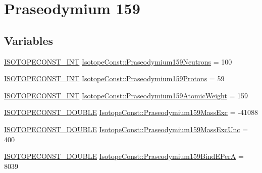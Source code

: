 \hypertarget{group___isotope_const-_praseodymium-_pr159}{}\section{Praseodymium 159}
\label{group___isotope_const-_praseodymium-_pr159}
\subsection*{Variables}
\begin{DoxyCompactItemize}
\item 
\mbox{\hyperlink{group___isotope_const-_macros_ga5f18360b3e99483a35c32d789e62621c}{I\+S\+O\+T\+O\+P\+E\+C\+O\+N\+S\+T\+\_\+\+I\+NT}} \mbox{\hyperlink{group___isotope_const-_praseodymium-_pr159_gacc7d7db38815aa372866db35a803ef28}{Isotope\+Const\+::\+Praseodymium159\+Neutrons}} = 100
\item 
\mbox{\hyperlink{group___isotope_const-_macros_ga5f18360b3e99483a35c32d789e62621c}{I\+S\+O\+T\+O\+P\+E\+C\+O\+N\+S\+T\+\_\+\+I\+NT}} \mbox{\hyperlink{group___isotope_const-_praseodymium-_pr159_gaf1ce12d765e6db467384acd3fed6d4b5}{Isotope\+Const\+::\+Praseodymium159\+Protons}} = 59
\item 
\mbox{\hyperlink{group___isotope_const-_macros_ga5f18360b3e99483a35c32d789e62621c}{I\+S\+O\+T\+O\+P\+E\+C\+O\+N\+S\+T\+\_\+\+I\+NT}} \mbox{\hyperlink{group___isotope_const-_praseodymium-_pr159_ga776cfc6a5a1688ac1ca62e75a3909ec0}{Isotope\+Const\+::\+Praseodymium159\+Atomic\+Weight}} = 159
\item 
\mbox{\hyperlink{group___isotope_const-_macros_ga8f45a7272ce02c0b4c65c44636ed719a}{I\+S\+O\+T\+O\+P\+E\+C\+O\+N\+S\+T\+\_\+\+D\+O\+U\+B\+LE}} \mbox{\hyperlink{group___isotope_const-_praseodymium-_pr159_gab6b50f2a6aeeb901d64c87634cf0ae83}{Isotope\+Const\+::\+Praseodymium159\+Mass\+Exc}} = -\/41088
\item 
\mbox{\hyperlink{group___isotope_const-_macros_ga8f45a7272ce02c0b4c65c44636ed719a}{I\+S\+O\+T\+O\+P\+E\+C\+O\+N\+S\+T\+\_\+\+D\+O\+U\+B\+LE}} \mbox{\hyperlink{group___isotope_const-_praseodymium-_pr159_ga76a4ff2487990bb4734014688832e34f}{Isotope\+Const\+::\+Praseodymium159\+Mass\+Exc\+Unc}} = 400
\item 
\mbox{\hyperlink{group___isotope_const-_macros_ga8f45a7272ce02c0b4c65c44636ed719a}{I\+S\+O\+T\+O\+P\+E\+C\+O\+N\+S\+T\+\_\+\+D\+O\+U\+B\+LE}} \mbox{\hyperlink{group___isotope_const-_praseodymium-_pr159_ga734ab91757b5443dbff693ca21d56ce5}{Isotope\+Const\+::\+Praseodymium159\+Bind\+E\+PerA}} = 8039

\end{DoxyCompactItemize}
